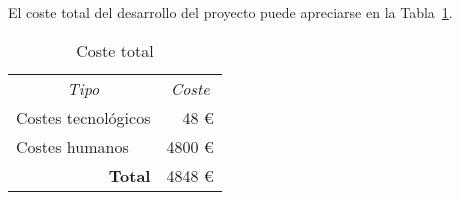 El coste total del desarrollo del proyecto puede apreciarse en la Tabla~\ref{tab:coste-total}.

\begin{table}[ht]
\centering
\caption{Coste total}
\label{tab:coste-total}
\begin{tabular}{lr}
\hline
\multicolumn{1}{c}{\multirow{2}{*}{\textit{Tipo}}} & \multicolumn{1}{c}{\multirow{2}{*}{\textit{Coste}}} \\
\multicolumn{1}{c}{}                               & \multicolumn{1}{c}{}                                \\ \hline
Costes tecnológicos                                & 48 €                                                \\ \hline
Costes humanos                                     & 4800 €                                              \\ \hline
\multicolumn{1}{r}{\textbf{Total}}                 & 4848 €                                              \\ \hline
\end{tabular}
\end{table}